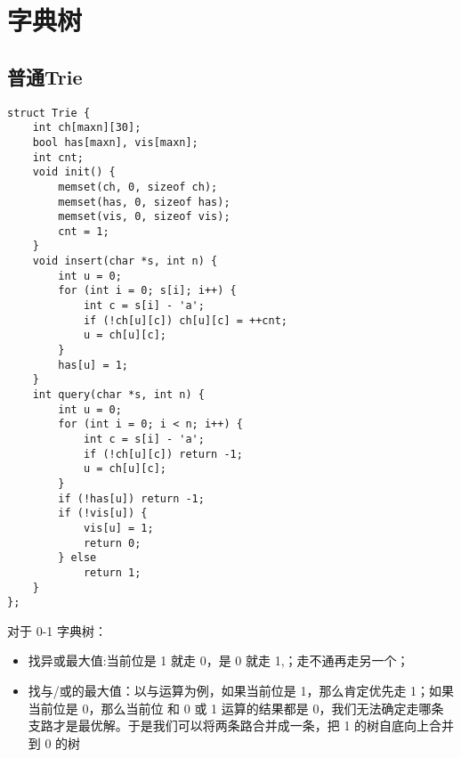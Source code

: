 \section{字典树}
\subsection{普通Trie}
\begin{verbatim}
struct Trie {
    int ch[maxn][30];
    bool has[maxn], vis[maxn];
    int cnt;
    void init() {
        memset(ch, 0, sizeof ch);
        memset(has, 0, sizeof has);
        memset(vis, 0, sizeof vis);
        cnt = 1;
    }
    void insert(char *s, int n) {
        int u = 0;
        for (int i = 0; s[i]; i++) {
            int c = s[i] - 'a';
            if (!ch[u][c]) ch[u][c] = ++cnt;
            u = ch[u][c];
        }
        has[u] = 1;
    }
    int query(char *s, int n) {
        int u = 0;
        for (int i = 0; i < n; i++) {
            int c = s[i] - 'a';
            if (!ch[u][c]) return -1;
            u = ch[u][c];
        }
        if (!has[u]) return -1;
        if (!vis[u]) {
            vis[u] = 1;
            return 0;
        } else
            return 1;
    }
};
\end{verbatim}
对于 0-1 字典树：
\begin{itemize}
\item 找异或最大值:当前位是 1 就走 0，是 0 就走 1,；走不通再走另一个；
\item 找与/或的最大值：以与运算为例，如果当前位是 1，那么肯定优先走 1；如果当前位是 0，那么当前位 和 0 或 1 运算的结果都是 0，我们无法确定走哪条支路才是最优解。于是我们可以将两条路合并成一条，把 1 的树自底向上合并到 0 的树
\end{itemize}

